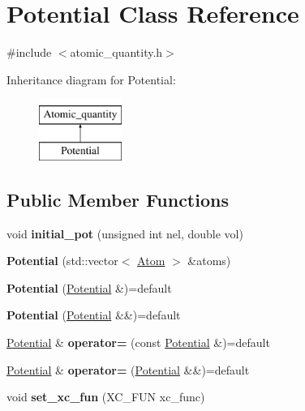 \hypertarget{classPotential}{}\section{Potential Class Reference}
\label{classPotential}


{\ttfamily \#include $<$atomic\+\_\+quantity.\+h$>$}

Inheritance diagram for Potential\+:\begin{figure}[H]
\begin{center}
\leavevmode
\includegraphics[height=2.000000cm]{classPotential}
\end{center}
\end{figure}
\subsection*{Public Member Functions}
\begin{DoxyCompactItemize}
\item 
\mbox{\label{classPotential_a2775f7e77aa0865858d2d2e735e06167}} 
void {\bfseries initial\+\_\+pot} (unsigned int nel, double vol)
\item 
\mbox{\label{classPotential_a97ea1890fa2af5471641c82ef9c70402}} 
{\bfseries Potential} (std\+::vector$<$ \hyperlink{classAtom}{Atom} $>$ \&atoms)
\item 
\mbox{\label{classPotential_a8dcd5f4bc4085df093c7833ae4aeb5e6}} 
{\bfseries Potential} (\hyperlink{classPotential}{Potential} \&)=default
\item 
\mbox{\label{classPotential_a92f853f35bf8114439efe62bccde3f83}} 
{\bfseries Potential} (\hyperlink{classPotential}{Potential} \&\&)=default
\item 
\mbox{\label{classPotential_a09e2051ee4ed86d3d1d300d3b2185c49}} 
\hyperlink{classPotential}{Potential} \& {\bfseries operator=} (const \hyperlink{classPotential}{Potential} \&)=default
\item 
\mbox{\label{classPotential_aed71b6948a719fa8b52db91591bb5429}} 
\hyperlink{classPotential}{Potential} \& {\bfseries operator=} (\hyperlink{classPotential}{Potential} \&\&)=default
\item 
\mbox{\label{classPotential_a6a6eca1dc9b32494f6189404e503eb38}} 
void {\bfseries set\+\_\+xc\+\_\+fun} (X\+C\+\_\+\+F\+UN xc\+\_\+func)
\end{DoxyCompactItemize}
